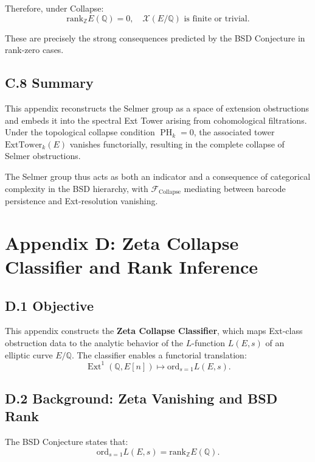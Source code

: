 \documentclass[11pt]{article}
\DeclareMathOperator{\Ext}{Ext}
\DeclareMathOperator{\PH}{PH}
\newcommand{\QQ}{\mathbb{Q}}
\newcommand{\ZZ}{\mathbb{Z}}
\newcommand{\Sha}{\mathcal{X}}
\begin{document}
Therefore, under Collapse:
\[
\mathrm{rank}_{\ZZ} E(\QQ) = 0, \quad \Sha(E/\QQ) \text{ is finite or trivial}.
\]

These are precisely the strong consequences predicted by the BSD Conjecture in rank-zero cases.

\subsection*{C.8 Summary}

This appendix reconstructs the Selmer group as a space of extension obstructions and embeds it into the spectral Ext Tower arising from cohomological filtrations. Under the topological collapse condition $\PH_k = 0$, the associated tower $\mathrm{ExtTower}_k(E)$ vanishes functorially, resulting in the complete collapse of Selmer obstructions.

The Selmer group thus acts as both an indicator and a consequence of categorical complexity in the BSD hierarchy, with $\mathcal{F}_{\mathrm{Collapse}}$ mediating between barcode persistence and Ext-resolution vanishing.




\section*{Appendix D: Zeta Collapse Classifier and Rank Inference}

\subsection*{D.1 Objective}

This appendix constructs the \textbf{Zeta Collapse Classifier}, which maps Ext-class obstruction data to the analytic behavior of the $L$-function $L(E,s)$ of an elliptic curve $E/\QQ$.  
The classifier enables a functorial translation:
\[
\Ext^1(\QQ, E[n]) \mapsto \mathrm{ord}_{s=1} L(E,s).
\]

\subsection*{D.2 Background: Zeta Vanishing and BSD Rank}

The BSD Conjecture states that:
\[
\mathrm{ord}_{s=1} L(E,s) = \mathrm{rank}_{\ZZ} E(\QQ).
\]
\end{document}
